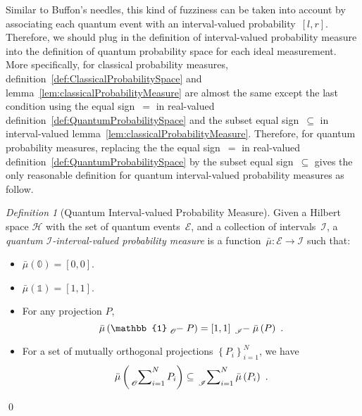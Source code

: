 \documentclass{article}
\theoremstyle{remark}
\newtheorem{definition}{Definition}
\newcommand{\events}{\ensuremath{\mathcal{E}}}
\newcommand{\Hilb}{\mathcal{H}}
\begin{document}
Similar to Buffon's needles, this kind of fuzziness can be taken into
account by associating each quantum event with an interval-valued
probability~$\left[l,r\right]$. Therefore, we should plug in the
definition of interval-valued probability measure into the definition
of quantum probability space for each ideal measurement. More specifically,
for classical probability measures, definition~\ref{def:ClassicalProbabilitySpace}
and lemma~\ref{lem:classicalProbabilityMeasure} are almost the same
except the last condition using the equal sign~$=$ in real-valued
definition~\ref{def:QuantumProbabilitySpace} and the subset equal
sign~$\subseteq$ in interval-valued lemma~\ref{lem:classicalProbabilityMeasure}.
Therefore, for quantum probability measures, replacing the the equal
sign~$=$ in real-valued definition~\ref{def:QuantumProbabilitySpace}
by the subset equal sign~$\subseteq$ gives the only reasonable definition
for quantum interval-valued probability measures as follow.

\begin{definition}[Quantum Interval-valued Probability Measure]\label{def:QuantumInterval-valuedProbability}
Given a Hilbert space $\Hilb$ with the set of quantum events~$\events$,
and a collection of intervals~$\mathscr{I}$, a \emph{quantum $\mathscr{I}$-interval-valued
probability measure} is a function~$\bar{\mu}:\events\rightarrow\mathscr{I}$
such that: 
\begin{itemize}
\item $\bar{\mu}(\mathbb{0})=\left[0,0\right]$. 
\item $\bar{\mu}(\mathbb{1})=\left[1,1\right]$. 
\item For any projection $P$, 
\begin{equation}
\bar{\mu}\left(\mathbb{1}\tensor*[_{\mathscr{O}}]{-}{}P\right)=\left[1,1\right]\tensor*[_{\mathscr{I}}]{-}{}\bar{\mu}\left(P\right)\textrm{ .}\label{eq:QuantumInterval-valuedProbability-Complement}
\end{equation}
\item For a set of mutually orthogonal projections $\left\{ P_{i}\right\} _{i=1}^{N}$,
we have 
\begin{equation}
\bar{\mu}\left(\sideset{_{\mathscr{O}}}{_{i=1}^{N}}\sum P_{i}\right)\subseteq\sideset{_{\mathscr{I}}}{_{i=1}^{N}}\sum\bar{\mu}\left(P_{i}\right)\textrm{ .}\label{eq:QuantumInterval-valuedProbability-Inclusion}
\end{equation}
\end{itemize}
\qed\end{definition}
\end{document}
